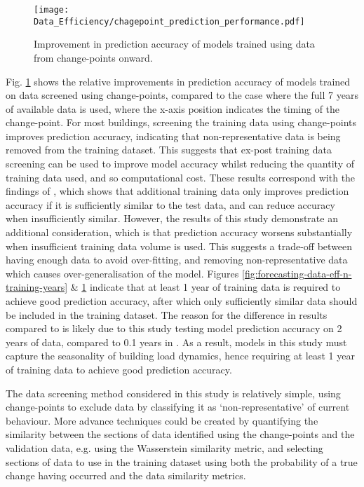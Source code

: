 \begin{figure}
    \centering
    \texttt{[image: Data\_Efficiency/chagepoint\_prediction\_performance.pdf]}
    \caption{Improvement in prediction accuracy of models trained using data from change-points onward.}
    \label{fig:forecasting-data-eff-changepoints}
\end{figure}

Fig. \ref{fig:forecasting-data-eff-changepoints} shows the relative improvements in prediction accuracy of models trained on data screened using change-points, compared to the case where the full 7 years of available data is used, where the x-axis position indicates the timing of the change-point. For most buildings, screening the training data using change-points improves prediction accuracy, indicating that non-representative data is being removed from the training dataset. This suggests that ex-post training data screening can be used to improve model accuracy whilst reducing the quantity of training data used, and so computational cost. These results correspond with the findings of \citep{choi2023PerformanceEvaluationDeep}, which shows that additional training data only improves prediction accuracy if it is sufficiently similar to the test data, and can reduce accuracy when insufficiently similar. However, the results of this study demonstrate an additional consideration, which is that prediction accuracy worsens substantially when insufficient training data volume is used. This suggests a trade-off between having enough data to avoid over-fitting, and removing non-representative data which causes over-generalisation of the model. Figures \ref{fig:forecasting-data-eff-n-training-years} \& \ref{fig:forecasting-data-eff-changepoints} indicate that at least 1 year of training data is required to achieve good prediction accuracy, after which only sufficiently similar data should be included in the training dataset. The reason for the difference in results compared to \citep{choi2023PerformanceEvaluationDeep} is likely due to this study testing model prediction accuracy on 2 years of data, compared to 0.1 years in \citep{choi2023PerformanceEvaluationDeep}. As a result, models in this study must capture the seasonality of building load dynamics, hence requiring at least 1 year of training data to achieve good prediction accuracy.

The data screening method considered in this study is relatively simple, using change-points to exclude data by classifying it as `non-representative' of current behaviour. More advance techniques could be created by quantifying the similarity between the sections of data identified using the change-points and the validation data, e.g. using the Wasserstein similarity metric, and selecting sections of data to use in the training dataset using both the probability of a true change having occurred and the data similarity metrics.

